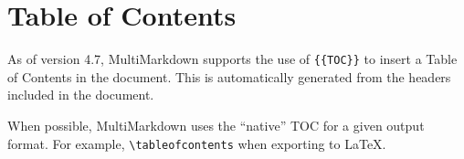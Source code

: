 \section{Table of Contents }
\label{tableofcontents}

As of version 4.7, MultiMarkdown supports the use of \texttt{\{\{TOC\}\}} to insert a Table of Contents in the document. This is automatically generated from the headers included in the document.

When possible, MultiMarkdown uses the ``native'' TOC for a given output format. For example, \texttt{\textbackslash{}tableofcontents} when exporting to LaTeX.




